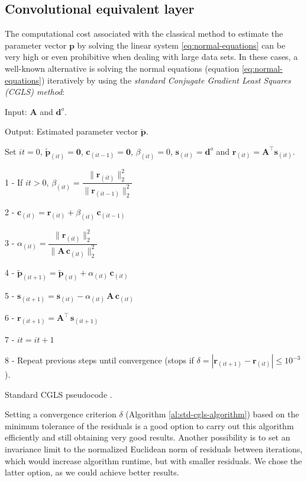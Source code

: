 \documentclass[manuscript]{geophysics}
\begin{document}
\subsection{Convolutional equivalent layer}

The computational cost associated with the classical method to estimate the parameter 
vector $\mathbf{p}$ by solving the linear system \ref{eq:normal-equations} can be very high 
or even prohibitive when dealing with large data sets. In these cases, a well-known alternative
is solving the normal equations (equation \ref{eq:normal-equations}) iteratively by 
using the \textit{standard Conjugate Gradient Least Squares (CGLS) method}:

\begin{algorithm}[H]
	Input: $\mathbf{A}$ and $\mathbf{d}^{o}$.
	
	Output: Estimated parameter vector $\tilde{\mathbf{p}}$.
	
	Set $it = 0$, $\tilde{\mathbf{p}}_{(it)} = \mathbf{0}$, $\mathbf{c}_{(it-1)} = \mathbf{0}$, $\beta_{(it)} = 0$, $\mathbf{s}_{(it)} = \mathbf{d}^{o}$ and $\mathbf{r}_{(it)} = \mathbf{A}^{\top} \mathbf{s}_{(it)}$.
	
	1 - If $it > 0$, $\beta_{(it)} = \dfrac{\| \mathbf{r}_{(it)} \|_{2}^{2}}{\| \mathbf{r}_{(it - 1)} \|_{2}^{2}}$
	
	2 - $\mathbf{c}_{(it)} = \mathbf{r}_{(it)} + \beta_{(it)} \, \mathbf{c}_{(it - 1)}$
	
	3 - $\alpha_{(it)} = \dfrac{{\| \mathbf{r}_{(it)}\|_{2}^{2}}}{\| \mathbf{A} \, \mathbf{c}_{(it)} \|_{2}^{2}}$
	
	4 - $\tilde{\mathbf{p}}_{(it + 1)} = \tilde{\mathbf{p}}_{(it)} + \alpha_{(it)} \, \mathbf{c}_{(it)}$
	
	5 - $\mathbf{s}_{(it + 1)} = \mathbf{s}_{(it)} - \alpha_{(it)} \, \mathbf{A} \, \mathbf{c}_{(it)}$
	
	6 - $\mathbf{r}_{(it + 1)} = \mathbf{A}^{\top} \, \mathbf{s}_{(it + 1)}$
	
	7 - $it = it + 1$
	
	8 - Repeat previous steps until convergence (stops if $\delta = |\mathbf{r}_{(it + 1)} - \mathbf{r}_{(it)}| \leq 10^{-3}$).
	
	\caption{Standard CGLS pseudocode \citep[][ p. 166]{aster2019parameter}.}
	\label{al:std-cgls-algorithm}
\end{algorithm}

Setting a convergence criterion $\delta$ (Algorithm \ref{al:std-cgls-algorithm}) based on the minimum tolerance 
of the residuals is a good option to carry out this algorithm efficiently and still obtaining very good results. 
Another possibility is to set an invariance limit to the normalized Euclidean norm of residuals between iterations,
which would increase algorithm runtime, but with smaller residuals. 
We chose the latter option, as we could achieve better results.
\end{document}
